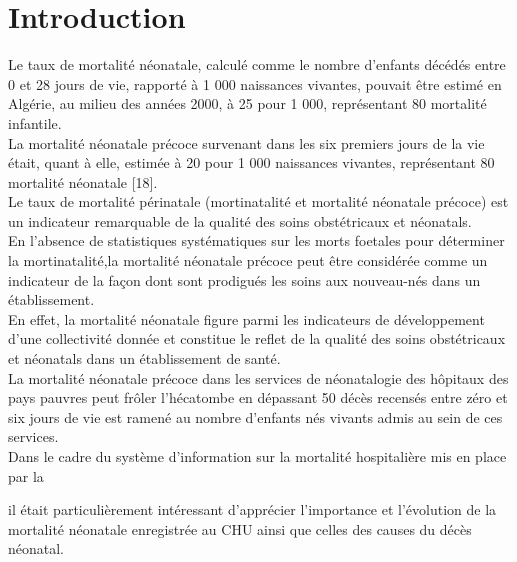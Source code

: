 \section{Introduction}

Le taux de mortalité néonatale, calculé comme le nombre
d’enfants décédés entre 0 et 28 jours de vie, rapporté à 1 000
naissances vivantes, pouvait être estimé en Algérie, au milieu
des années 2000, à 25 pour 1 000, représentant 80 %
mortalité infantile.\\ 

La mortalité néonatale précoce survenant
dans les six premiers jours de la vie était, quant à elle, estimée
à 20 pour 1 000 naissances vivantes, représentant 80 %
mortalité néonatale [18].\\

Le taux de mortalité périnatale (mortinatalité et mortalité
néonatale précoce) est un indicateur remarquable de la
qualité des soins obstétricaux et néonatals.\\

En l’absence de statistiques systématiques sur les morts foetales pour déterminer la mortinatalité,la mortalité néonatale
précoce peut être considérée comme un indicateur de la façon dont
sont prodigués les soins aux nouveau-nés dans un établissement.\\

En effet, la mortalité néonatale figure parmi les
indicateurs de développement d’une collectivité donnée
et constitue le reflet de la qualité des soins obstétricaux et
néonatals dans un établissement de santé.\\

La mortalité néonatale précoce dans les services de
néonatalogie des hôpitaux des pays pauvres peut frôler
l’hécatombe en dépassant 50 %
décès recensés entre zéro et six jours de vie est ramené au
nombre d’enfants nés vivants admis au sein de ces services.\\

Dans le cadre du système d’information sur la mortalité
hospitalière mis en place par la \dsp \ 

il était particulièrement intéressant d’apprécier l’importance et l’évolution de la mortalité néonatale enregistrée au CHU ainsi que celles des causes du décès néonatal.
